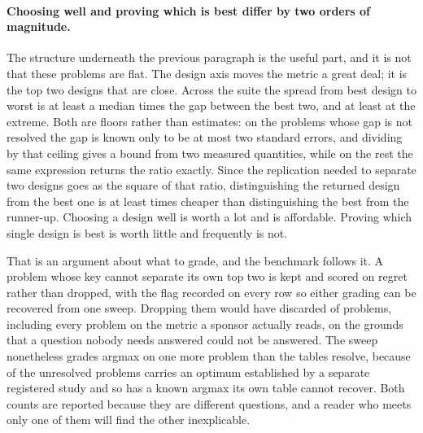 \documentclass[11pt]{article}
\begin{document}
\paragraph{Choosing well and proving which is best differ by two orders of magnitude.} The
structure underneath the previous paragraph is the useful part, and it is not that these problems
are flat. The design axis moves the metric a great deal; it is the top two designs that are close.
Across the suite the spread from best design to worst is at least a median
\BnSpreadOverGapMed{} times the gap between the best two, and at least \BnSpreadOverGapMax{} at the
extreme. Both are floors rather than estimates: on the \BnSpreadBounded{} problems whose gap is not
resolved the gap is known only to be at most two standard errors, and dividing by that ceiling
gives a bound from two measured quantities, while on the rest the same expression returns the ratio
exactly. Since the replication needed to separate two designs goes as the square of that ratio,
distinguishing the returned design from the best one is at least \BnCheaper{} times cheaper than
distinguishing the best from the runner-up. Choosing a design well is worth a lot and is affordable. Proving which single design is
best is worth little and frequently is not.

That is an argument about what to grade, and the benchmark follows it. A problem whose key cannot
separate its own top two is kept and scored on regret rather than dropped, with the flag recorded on
every row so either grading can be recovered from one sweep. Dropping them would have discarded
\BnKeyUnresolved{} of \BnKeyProblems{} problems, including every problem on the metric a sponsor
actually reads, on the grounds that a question nobody needs answered could not be answered. The
sweep nonetheless grades argmax on one more problem than the tables resolve, because
\BnArgmaxFromStudy{} of the unresolved problems carries an optimum established by a separate
registered study and so has a known argmax its own table cannot recover. Both counts are reported
because they are different questions, and a reader who meets only one of them will find the other
inexplicable.
\end{document}
